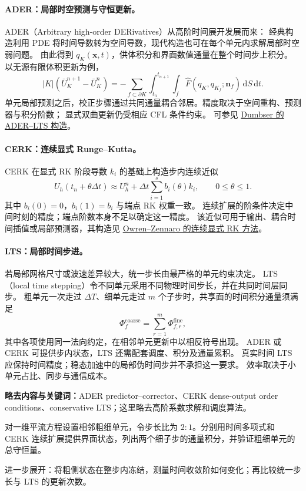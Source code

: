 \documentclass[11pt,openany]{ctexbook}
\newcommand{\dd}{\,\mathrm d}
\begin{document}
\paragraph{ADER：局部时空预测与守恒更新。}
ADER（Arbitrary high-order DERivatives）从高阶时间展开发展而来：
经典构造利用 PDE 将时间导数转为空间导数，现代构造也可在每个单元内求解局部时空弱问题。
由此得到 $q_K(\bm x,t)$，供体积分和界面数值通量在整个时间步上积分。
以无源有限体积更新为例，
\[
|K|(\bar U_K^{n+1}-\bar U_K^n)
=-\sum_{f\subset\partial K}\int_{t_n}^{t_{n+1}}\int_f
\widehat F(q_K,q_{K_f};\bm n_f)\dd S\dd t.
\]
单元局部预测之后，校正步骤通过共同通量耦合邻居。精度取决于空间重构、预测器与积分阶数；
显式双曲更新仍受相应 CFL 条件约束。
可参见 \href{https://doi.org/10.1016/j.cma.2014.07.019}{Dumbser 的 ADER--LTS 构造}。

\paragraph{CERK：连续显式 Runge--Kutta。}
CERK 在显式 RK 阶段导数 $k_i$ 的基础上构造步内连续近似
\[
U_h(t_n+\theta\Delta t)\approx
U_h^n+\Delta t\sum_{i=1}^{s}b_i(\theta)k_i,\qquad 0\le\theta\le1.
\]
其中 $b_i(0)=0$，$b_i(1)=b_i$ 与端点 RK 权重一致。
连续扩展的阶条件决定中间时刻的精度；端点阶数本身不足以确定这一精度。
该近似可用于输出、耦合时间插值或局部预测器，其构造见
\href{https://doi.org/10.1137/0913084}{Owren--Zennaro 的连续显式 RK 方法}。

\paragraph{LTS：局部时间步进。}
若局部网格尺寸或波速差异较大，统一步长由最严格的单元约束决定。
LTS（local time stepping）令不同单元采用不同物理时间步长，并在共同时间层同步。
粗单元一次走过 $\Delta T$、细单元走过 $m$ 个子步时，共享面的时间积分通量须满足
\[
\Phi_f^{\mathrm{coarse}}
=\sum_{r=1}^{m}\Phi_{f,r}^{\mathrm{fine}},
\]
其中各项使用同一法向约定，在相邻单元更新中以相反符号出现。
ADER 或 CERK 可提供步内状态，LTS 还需配套调度、积分及通量累积。
真实时间 LTS 应保持时间精度；稳态加速中的局部伪时间步并不承担这一要求。
效率取决于小单元占比、同步与通信成本。

\begin{askai}
\textbf{略去内容与关键词：}ADER predictor--corrector、CERK dense-output order conditions、conservative LTS；这里略去高阶系数求解和调度算法。

对一维平流方程设置相邻粗细单元，令步长比为 $2:1$。分别用时间多项式和 CERK 连续扩展提供界面状态，列出两个细子步的通量积分，并验证粗细单元的总守恒量。

进一步展开：将粗侧状态在整步内冻结，测量时间收敛阶如何变化；再比较统一步长与 LTS 的更新次数。
\end{askai}
\end{document}
